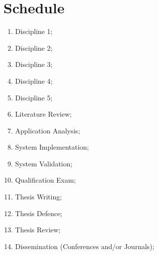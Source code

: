\documentclass[
    12pt,                       %
    oneside,                    %
    a4paper,                    %
    brazil,                     %
    french,                     %
    spanish,                    %
    english,                    %
    ]{abntex2}
\begin{document}
\section{Schedule} \label{sec:scheadule}
\begin{enumerate}
    \item Discipline 1; %
    \item Discipline 2; %
    \item Discipline 3; %
    \item Discipline 4; %
    \item Discipline 5; %
    \item Literature Review; %
    \item Application Analysis; %
    \item System Implementation; %
    \item System Validation; %
    \item Qualification Exam; %
    \item Thesis Writing; %
    \item Thesis Defence; %
    \item Thesis Review; %
    \item Dissemination (Conferences and/or Journals); %
\end{enumerate}
\end{document}
